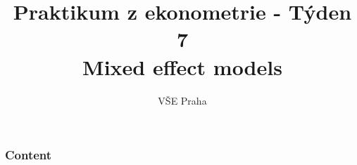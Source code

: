 \documentclass{beamer}
\title[LME]{Praktikum z ekonometrie - Týden 7 \\Mixed effect models} %
\author{VŠE Praha} %
\institute[4EK417] %
{
\medskip
\textit{Tomáš Formánek} %
}
\date{} %
\begin{document}
\begin{frame}
\titlepage %
\end{frame}

\begin{frame}
\frametitle{Content} %
\tableofcontents %
\end{frame}

\end{document}
